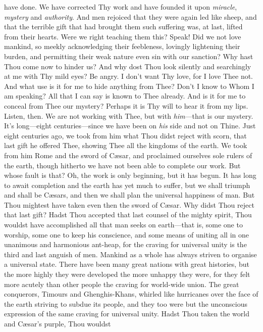 have done. We have corrected Thy work and have founded it upon
\textit{miracle}, \textit{mystery} and \textit{authority}. And men
rejoiced that they were again led like sheep, and that the terrible
gift that had brought them such suffering was, at last, lifted from
their hearts. Were we right teaching them this? Speak! Did we not love
mankind, so meekly acknowledging their feebleness, lovingly lightening
their burden, and permitting their weak nature even sin with our
sanction? Why hast Thou come now to hinder us? And why dost Thou look
silently and searchingly at me with Thy mild eyes? Be angry. I don't
want Thy love, for I love Thee not. And what use is it for me to hide
anything from Thee? Don't I know to Whom I am speaking? All that I can
say is known to Thee already. And is it for me to conceal from Thee
our mystery? Perhaps it is Thy will to hear it from my lips. Listen,
then. We are not working with Thee, but with \textit{him}---that is
our mystery. It's long---eight cen\-tu\-ries---since we have been on
\textit{his} side and not on Thine. Just eight centuries ago, we took
from him what Thou didst reject with scorn, that last gift he offered
Thee, showing Thee all the kingdoms of the earth. We took from him
Rome and the sword of C\ae sar, and proclaimed ourselves sole rulers
of the earth, though hitherto we have not been able to complete our
work. But whose fault is that? Oh, the work is only beginning, but it
has begun. It has long to await completion and the earth has yet much
to suffer, but we shall triumph and shall be C\ae sars, and then we
shall plan the universal happiness of man. But Thou mightest have
taken even then the sword of C\ae sar. Why didst Thou reject that last
gift? Hadst Thou accepted that last counsel of the mighty spirit, Thou
wouldst have accomplished all that man seeks on earth---that is, some
one to worship, some one to keep his conscience, and some means of
uniting all in one unanimous and harmonious ant-heap, for the craving
for universal unity is the third and last anguish of men. Mankind as a
whole has always striven to organise a universal state. There have
been many great nations with great histories, but the more highly they
were developed the more unhappy they were, for  they felt
more acutely than other people the craving for world-wide union. The
great conquerors, Timours and Ghenghis-Khans, whirled like hurricanes
over the face of the earth striving to subdue its people, and they too
were but the unconscious expression of the same craving for universal
unity. Hadst Thou taken the world and C\ae sar's purple, Thou wouldst
